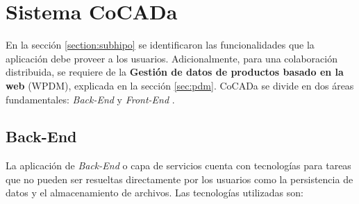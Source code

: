 \clearpage
\section{Sistema CoCADa}
\label{sistema-cocada}

En la sección \ref{section:subhipo} se identificaron las  funcionalidades que la aplicación debe proveer a los usuarios. Adicionalmente, para una colaboración distribuida, se requiere de la \textbf{Gestión de datos de productos basado en la web} (WPDM), explicada en la sección \ref{sec:pdm}. CoCADa se divide en dos áreas fundamentales: \textit{Back-End} y \textit{Front-End} \citep{mardan2015full}.



    
\subsection{Back-End}
La aplicación de \textit{Back-End} o capa de servicios cuenta con tecnologías para tareas que no pueden ser resueltas directamente por los usuarios como la persistencia de datos y el almacenamiento de archivos. Las tecnologías utilizadas son:


